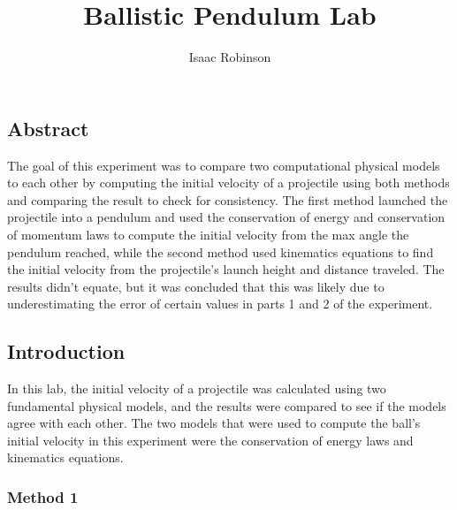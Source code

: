 \documentclass[11pt]{article}
\title{Ballistic Pendulum Lab}
\author{Isaac Robinson}
\begin{document}
    
    \maketitle
    
    

    
    \hypertarget{abstract}{%
\subsection*{\centering Abstract}\label{abstract}}

The goal of this experiment was to compare two computational physical
models to each other by computing the initial velocity of a projectile
using both methods and comparing the result to check for consistency.
The first method launched the projectile into a pendulum and used the
conservation of energy and conservation of momentum laws to compute the
initial velocity from the max angle the pendulum reached, while the
second method used kinematics equations to find the initial velocity
from the projectile's launch height and distance traveled. The results
didn't equate, but it was concluded that this was likely due to
underestimating the error of certain values in parts 1 and 2 of the
experiment.

\hypertarget{introduction}{%
\subsection*{\centering Introduction}\label{introduction}}

In this lab, the initial velocity of a projectile was calculated using
two fundamental physical models, and the results were compared to see if
the models agree with each other. The two models that were used to
compute the ball's initial velocity in this experiment were the
conservation of energy laws and kinematics equations.

\hypertarget{method-1}{%
\subsubsection*{\centering Method 1}\label{method-1}}
\end{document}
